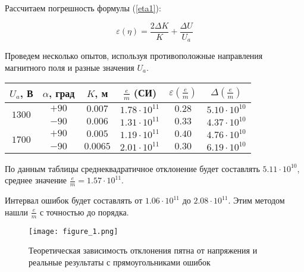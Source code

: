 Рассчитаем погрешность формулы (\ref{eta1}):

\begin{equation}
	\varepsilon{(\eta)}=\frac{2\Delta{K}}{K}+\frac{\Delta{U}}{U_a}
\end{equation}

Проведем несколько опытов, используя противоположные направления магнитного поля и разные значения $U_a$.


\begin{table}[h]
\begin{center}
\begin{tabular}{|c|c|c|c|c|c|}

\hline
$U_a$, В & $\alpha$, град & $K$, м & $\frac{e}{m}$ (СИ) & $\varepsilon{(\frac{e}{m})}$ & $\Delta{(\frac{e}{m})}$\\
\hline
\multirow{2}{*}{$1300$} & $+90$ & $0.007$ & $1.78\cdot10^{11}$ & $0.28$ & $5.10\cdot10^{10}$ \\ 

\cline{2-6}
						& $-90$ & $0.006$ & $1.31\cdot10^{11}$ & $0.33$ & $4.37\cdot10^{10}$ \\ \hline
\multirow{2}{*}{$1700$} & $+90$ & $0.005$ & $1.19\cdot10^{11}$ & $0.40$ & $4.76\cdot10^{10}$ \\
\cline{2-6}
						& $-90$ &$0.0065$ & $2.01\cdot10^{11}$ & $0.30$ & $6.19\cdot10^{10}$ \\ \hline

\end{tabular}
\end{center}
\end{table} 

По данным таблицы среднеквадратичное отклонение будет составлять $5.11\cdot10^{10}$, среднее значение $\frac{e}{m}=1.57\cdot10^{11}$.

Интервал ошибок будет составлять от $1.06\cdot10^{11}$ до $2.08\cdot10^{11}$. Этим методом нашли $\frac{e}{m}$ с точностью до порядка.

\begin{figure}[h!]
	\centering
	\texttt{[image: figure\_1.png]}
	\caption{Теоретическая зависимость отклонения пятна от напряжения и реальные результаты с прямоугольниками ошибок}
	\label{fig:figure1}
\end{figure}

